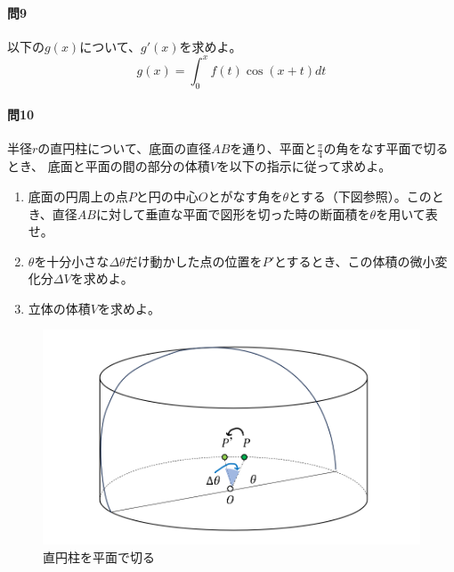 \documentclass[a4j,dvipdfmx]{jsarticle}
\newcommand{\linktoMOKUZI}{\vspace{\stretch{1}}\fbox{\centerline{\hyperref[目次]{目次に戻る}}}}
\begin{document}
            \paragraph{問9}以下の$g(x)$について、$g'(x)$を求めよ。
                \begin{equation*}
                    g(x)=\int_{0}^{x}f(t)\cos(x+t)dt
                \end{equation*}
                
            \paragraph{問10}%
                半径$r$の直円柱について、底面の直径$AB$を通り、平面と$\frac{\pi}{4}$の角をなす平面で切るとき、
                底面と平面の間の部分の体積$V$を以下の指示に従って求めよ。
                \begin{enumerate}
                    \item 底面の円周上の点$P$と円の中心$O$とがなす角を$\theta$とする（下図参照）。このとき、直径$AB$に対して垂直な平面で図形を切った時の断面積を$\theta$を用いて表せ。
                    \item $\theta$を十分小さな$\Delta \theta$だけ動かした点の位置を$P'$とするとき、この体積の微小変化分$\Delta V$を求めよ。
                    \item 立体の体積$V$を求めよ。
                \end{enumerate}
                \begin{figure}[h]
                    \centering
                    \includegraphics[keepaspectratio,scale=0.5]{img/QuuNote/questionForIntegral.png}
                    \caption{直円柱を平面で切る}
                \end{figure}
            \linktoMOKUZI
    \clearpage
\end{document}
